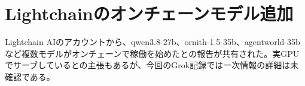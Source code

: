 \section{Lightchainのオンチェーンモデル追加}
Lightchain AIのアカウントから、qwen3.8-27b、ornith-1.5-35b、agentworld-35bなど複数モデルがオンチェーンで稼働を始めたとの報告が共有された。実GPUでサーブしているとの主張もあるが、今回のGrok記録では一次情報の詳細は未確認である。
